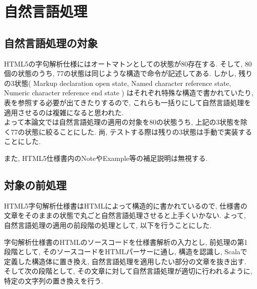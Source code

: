 \documentclass[uplatex,a4j]{jsreport}
\begin{document}
\chapter{自然言語処理}
\label{自然言語処理}
\section{自然言語処理の対象}
HTML5の字句解析仕様にはオートマトンとしての状態が80存在する. 
そして, 80個の状態のうち, 77の状態は同じような構造で命令が記述してある. 
しかし, 残りの3状態(
Markup declaration open state, 
Named character reference state, 
Numeric character reference end state
)
はそれぞれ特殊な構造で書かれていたり, 表を参照する必要が出てきたりするので, これらも一括りにして自然言語処理を適用させるのは複雑になると思われた. \\
よって本論文では自然言語処理の適用の対象を80の状態うち, 上記の3状態を除く77の状態に絞ることにした.
尚, テストする際は残りの3状態は手動で実装することにした.

また, HTML5仕様書内のNoteやExample等の補足説明は無視する.

\section{対象の前処理}
HTML5字句解析仕様書はHTMLによって構造的に書かれているので, 仕様書の文章をそのままの状態で丸ごと自然言語処理させると上手くいかない.
よって, 自然言語処理の適用の前段階の処理として, 以下を行うことにした.

字句解析仕様書のHTMLのソースコードを仕様書解析の入力とし, 
前処理の第1段階として, そのソースコードをHTMLパーサーに通し, 構造を認識し, Scalaで定義した構造体に置き換え, 自然言語処理を適用したい部分の文章を抜き出す. 
そして次の段階として, その文章に対して自然言語処理が適切に行われるように, 特定の文字列の置き換えを行う. 

\end{document}
